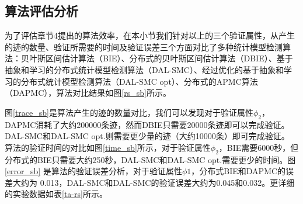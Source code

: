 \subsection{算法评估分析}
为了评估章节4提出的算法效率，在本小节我们针对以上的三个验证属性，从产生的迹的数量、验证所需要的时间及验证误差三个方面对比了多种统计模型检测算法：贝叶斯区间估计算法（BIE）、分布式的贝叶斯区间估计算法（DBIE）、基于抽象和学习的分布式统计模型检测算法（DAL-SMC）、经过优化的基于抽象和学习的分布式统计模型检测算法（DAL-SMC opt）、分布式的APMC\cite{herault2004approximate}算法（DAPMC），算法对比结果如图\ref{rs_sb}所示。
\begin{figure}[htbp]
\end{figure}

图\ref{trace_sb}是算法产生的迹的数量对比，我们可以发现对于验证属性$\phi_2$，DAPMC消耗了大约200000条迹，然而DBIE只需要20000条迹即可以完成验证。 DAL-SMC和DAL-SMC opt.则需要更少量的迹（大约10000条）即可完成验证。 算法的验证时间的对比如图\ref{time_sb}所示，对于验证属性$\phi_2$，BIE需要6000秒，但分布式的BIE只需要大约250秒，DAL-SMC和DAL-SMC opt.需要更少的时间。图\ref{error_sb} 是算法的验证误差分析，对于验证属性$\phi1$，分布式BIE和DAPMC的误差大约为 0.013，DAL-SMC和DAL-SMC的验证误差大约为0.045和0.032。更详细的实验数据如表\ref{ta-rs}所示。 

